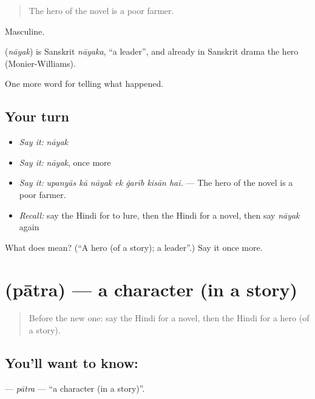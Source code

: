 \begin{quote}
The hero of the novel is a poor farmer.
\end{quote}

Masculine.

\begin{cousinweb}
\textbf{} (\emph{nāyak}) is Sanskrit \emph{nāyaka}, \textquotedblleft{}a leader\textquotedblright{}, and already in Sanskrit drama the hero (Monier-Williams).
\end{cousinweb}

\begin{grammarlens}[title={What you've built}]
One more word for telling what happened.
\end{grammarlens}

\subsection*{Your turn}
\begin{itemize}
\raggedright
  \item \emph{Say it:} \emph{nāyak}
  \item \emph{Say it:} \emph{nāyak}, once more
  \item \emph{Say it:} \emph{upanyās kā nāyak ek ġarīb kisān hai.} — The hero of the novel is a poor farmer.
  \item \emph{Recall:} say the Hindi for to lure, then the Hindi for a novel, then say \emph{nāyak} again
\end{itemize}

\begin{tcolorbox}[breakable,colback=teal!4,colframe=teal!35!black,title={Before you move on}]
What does  mean? (\textquotedblleft{}A hero (of a story); a leader\textquotedblright{}.) Say it once more.
\end{tcolorbox}
\section[\texorpdfstring{\hi{पात्र} (pātra)}{पात्र (pātra)}]{ (pātra) — a character (in a story)}

\label{lesson:HI-C340-patra}



\begin{quote}
Before the new one: say the Hindi for a novel, then the Hindi for a hero (of a story).
\end{quote}

\subsection*{You'll want to know: }
\textbf{} — \emph{pātra} — \textquotedblleft{}a character (in a story)\textquotedblright{}.

